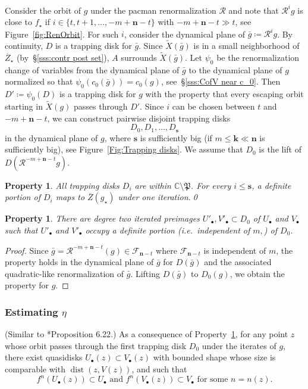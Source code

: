 \documentclass{amsart}
\newcommand{\1}{{\mathbb 1 }}
\newcommand\RR{\mathcal{R}}
\newcommand\Post{{\mathfrak P}}
\newcommand{\bbn}{{\mathbf n}}
\newcommand{\bbk}{{\mathbf k}}
\newcommand{\bbs}{{\mathbf s}}
\newcommand{\str}{{\star}}
\newcommand{\C}{\mathbb{C}}
\newcommand{\bFol}{{\boldsymbol{ \mathcal F}}}
\newtheorem{property}[thm]{Property}
\theoremstyle{remark}
\numberwithin{equation}{section}
\theoremstyle{definition}
\newcommand{\dist}{\operatorname{dist}}
\theoremstyle{nonumberbreak}
\begin{document}
 Consider the orbit of $g$ under the pacman renormalization $\RR$ and note that $\RR^i g$ is close to $f_\str$ if $i\in \{t,t+1,\dots ,-m+\bbn-t\}$ with $-m+\bbn-t\gg t$, see Figure~\ref{fig:RenOrbit}. For such $i$, consider the dynamical plane of $\bar g\coloneqq \RR^i g$. By continuity, $D$ is a trapping disk for $\bar g$. Since $\widetilde X(\bar g)$ is in a small neighborhood of $\overline Z_\str$ (by~\S\ref{sss:contr post set}), $A$ surrounds $\widetilde X(\bar g)$. Let $\psi_0$ be the renormalization change of variables from the dynamical plane of $\bar g$ to the dynamical plane of $g$ normalized so that $\psi_0( c_0(\bar g)) =c_0 (g)$, see~\S\ref{sss:CofV near c_0}. Then $D' \coloneqq \psi_0 (D)$ is a trapping disk for $g$ with the property that every escaping orbit starting in $\widetilde X(g)$ passes through $D'$. Since $i$ can be chosen between $t$ and $-m+\bbn-t$, we can construct pairwise disjoint trapping disks
\[D_0,D_1,\dots , D_\bbs\]
in the dynamical plane of $g$, where $\bbs$ is sufficiently big (if $m\le \bbk \ll \bbn$ is sufficiently big), see Figure~\ref{Fig:Trapping disks}. We assume that $D_0$ is the lift of $D( \RR^{-m+\bbn-t} g)$. 


\begin{property}
\label{prop:trap disk}
All trapping disks $D_i$ are within $\C\setminus \Post$. For every $i\le \bbs$, a definite portion of $D_i$ maps to $\overline Z(g_\str)$ under one iteration.\qed
\end{property}

\begin{property}
\label{prop:first trap disk}
There are degree two iterated preimages $U'_\bullet,V'_\bullet\subset D_0$ of $U_\bullet$ and $V_\bullet$ such that $U'_\bullet$ and $V'_\bullet$ occupy a definite  portion (i.e.~independent of $m,$) of $D_0$.
\end{property}
\begin{proof}
Since $\bar g=\RR^{-m+\bbn-t} (g)\in\bFol_{\bbn-t}$ where $\bFol_{\bbn-t}$ is independent of $m$, the property holds in the dynamical plane of $\bar g$ for $D(\bar g)$ and the associated quadratic-like renormalization of $\bar g$. Lifting $D(\bar g)$ to $D_0(g)$, we obtain the property for $g$.
\end{proof}




\subsubsection{Estimating $\eta$} (Similar to \cite{AL-posmeas}*{Proposition 6.22}.)
As a consequence of Property~\ref{prop:first trap disk}, for any point $z$ whose orbit passes through the first trapping
disk $D_0$ under the iterates of $g$, there exist quasidisks $U_\bullet(z) \subset V_\bullet(z)$ with bounded shape whose size is comparable with $\dist(z, V(z))$, and such that
\[f^{n} (U_\bullet(z)) \subset U_\bullet \text{ and }f^{n} (V_\bullet(z))\subset V_\bullet\text{ for some }n=n(z).\]
\end{document}
